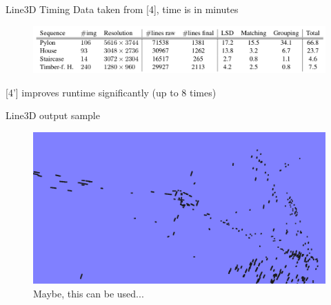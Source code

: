 \documentclass{beamer}
\begin{document}
\begin{frame}[t, fragile]{Line3D Timing}
Data taken from [4], time is in minutes
\begin{figure}
\centering
\includegraphics[scale=0.25]{line3dtime}
\end{figure}

[4'] improves runtime significantly (up to 8 times)
\end{frame}


\begin{frame}[t, fragile]{Line3D output sample}

\begin{figure}
\includegraphics[width=1\linewidth]{line3d_output}
\captionsetup{labelformat=empty}
\caption{Maybe, this can be used...}
\end{figure}
\end{frame}
\end{document}
